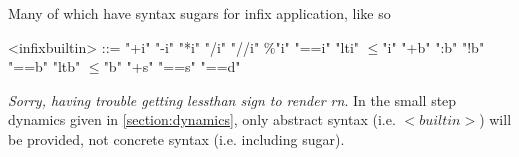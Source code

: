 \documentclass[../main.tex]{subfiles}
\begin{document}
Many of which have syntax sugars for infix application, like so
\begin{grammar}
    <infixbuiltin> ::=
        "+i" \alt "-i" \alt "*i" \alt "/i" \alt "//i" \alt $\%$"i" \alt "==i" \alt "lti" \alt $\leq$"i" \alt "+b" \alt ":b" \alt "!b" \alt "==b" \alt "ltb" \alt $\leq$"b" \alt "+s" \alt "==s" \alt "==d"
\end{grammar}
\textit{Sorry, having trouble getting lessthan sign to render rn}. In the small step dynamics given in \ref{section:dynamics}, only abstract syntax (i.e. $<builtin>$) will be provided, not concrete syntax (i.e. including sugar).
\end{document}
